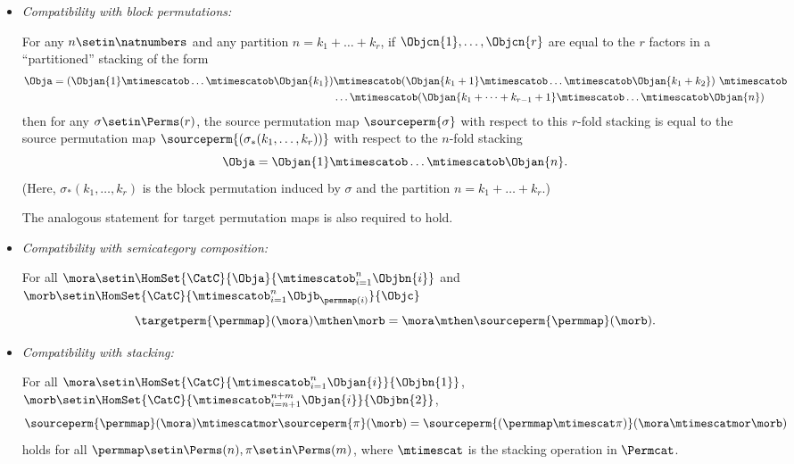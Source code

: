 \begin{ctdefinition}
\begin{itemize}
        \item \emph{Compatibility with block permutations:}

              For any $n \setin\natnumbers$ and any partition $n = k_1 + \dots + k_r$, if $\Objcn{1}, \dots, \Objcn{r}$ are equal to the $r$ factors in a ``partitioned'' stacking of the form
              \begin{align*}
                  \Obja = (\Objan{1} \mtimescatob \dots \mtimescatob \Objan{k_1}) & \mtimescatob (\Objan{k_1 + 1} \mtimescatob \dots \mtimescatob \Objan{k_1 + k_2}) \ \mtimescatob \\ & \dots \mtimescatob (\Objan{k_1 + \dots + k_{r-1} +1} \mtimescatob \dots \mtimescatob \Objan{n})
              \end{align*}
              then for any $\sigma \setin\Perms(r)$, the source permutation map $\sourceperm{\sigma}$ with respect to this $r$-fold stacking is equal to the source permutation map $\sourceperm{(\sigma_*(k_1, \dots, k_r))}$ with respect to the $n$-fold stacking
              \begin{equation*}
                  \Obja = \Objan{1} \mtimescatob \dots \mtimescatob \Objan{n}.
              \end{equation*}
              (Here, $\sigma_*(k_1, \dots, k_r)$ is the block permutation induced by $\sigma$ and the partition $n = k_1 + \dots + k_r$.)

              The analogous statement for target permutation maps is also required to hold.

        \item \emph{Compatibility with semicategory composition:}

              For all $\mora \setin \HomSet{\CatC}{\Obja}{\mtimescatob_{i=1}^n \Objbn{i}}$ and $\morb \setin \HomSet{\CatC}{\mtimescatob_{i=1}^n \Objb_{\permmap(i)}}{\Objc}$
              \begin{equation}
                  \label{eq:perm-compatibility-with-composition}
                  \targetperm{\permmap} (\mora) \mthen \morb = \mora \mthen \sourceperm{\permmap}(\morb).
              \end{equation}

        \item \emph{Compatibility with stacking:}

              For all $\mora \setin\HomSet{\CatC}{\mtimescatob_{i=1}^n \Objan{i}}{\Objbn{1}}$, $\morb \setin\HomSet{\CatC}{\mtimescatob_{i=n+1}^{n+m} \Objan{i}}{\Objbn{2}}$,
              \begin{equation}
                  \sourceperm{\permmap}(\mora) \mtimescatmor \sourceperm{\pi}(\morb) = \sourceperm{(\permmap \mtimescat \pi)}(\mora \mtimescatmor \morb)
              \end{equation}
              holds for all $\permmap \setin\Perms(n), \pi \setin\Perms(m)$, where $\mtimescat$ is the stacking operation in $\Permcat$.


\end{itemize}
\end{ctdefinition}
